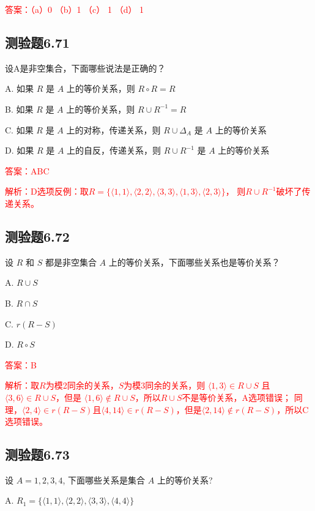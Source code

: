 \documentclass[UTF8, heading=true]{ctexart}
\begin{document}
\textcolor{red}{答案：（a）0 （b）1 （c） 1 （d） 1}

\subsection{测验题6.71}

设A是非空集合，下面哪些说法是正确的？

A. 如果 $R$ 是 $A$ 上的等价关系，则 $R \circ R=R$

B. 如果 $R$ 是 $A$ 上的等价关系，则 $R \cup R^{-1}=R$

C. 如果 $R$ 是 $A$ 上的对称，传递关系，则 $R \cup \Delta_A$ 是 $A$ 上的等价关系

D. 如果 $R$ 是 $A$ 上的自反，传递关系，则 $R \cup R^{-1}$ 是 $A$ 上的等价关系

\textcolor{red}{答案：ABC}

\textcolor{red}{解析：D选项反例：取$R=\{\langle 1,1\rangle, \langle 2,2\rangle, \langle 3,3\rangle , \langle 1 , 3 \rangle , \langle 2 , 3 \rangle \}$，
则$R \cup R^{-1}$破坏了传递关系。}



\subsection{测验题6.72}

设 $R$ 和 $S$ 都是非空集合 $A$ 上的等价关系，下面哪些关系也是等价关系？

A. $R \cup S$

B. $R \cap S$

C. $r(R-S)$

D. $R \circ S$

\textcolor{red}{答案：B}

\textcolor{red}{解析：取$R$为模2同余的关系，$S$为模3同余的关系，则 $\langle 1,3\rangle \in R \cup S$ 且 $\langle 3,6\rangle \in R \cup S$，但是 $\langle 1,6\rangle \notin R \cup S$，所以$R \cup S$不是等价关系，A选项错误；
同理，$\langle 2,4 \rangle \in r(R-S)$且$\langle 4,14 \rangle \in r(R-S)$，但是$\langle 2,14 \rangle \notin r(R-S)$，所以C选项错误。}

\subsection{测验题6.73}

设 $A={1,2,3,4}$, 下面哪些关系是集合 $A$ 上的等价关系?

A. $R_1=\{\langle 1,1\rangle,\langle 2,2\rangle,\langle 3,3\rangle,\langle 4,4\rangle\}$
\end{document}
